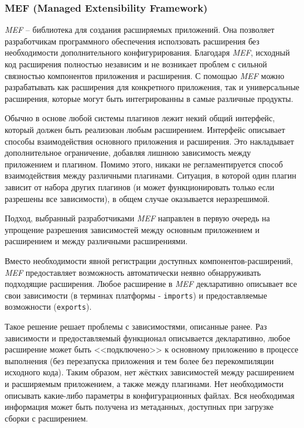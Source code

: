 \subsubsection{MEF (Managed Extensibility Framework)}

{\it MEF} -- библиотека для создания расширяемых приложений. Она позволяет разработчикам программного обеспечения исползовать расширения без необходимости дополнительного конфигурирования. Благодаря {\it MEF}, исходный код расширения полностью независим и не возникает проблем с сильной связностью компонентов приложения и расширения. С помощью {\it MEF} можно разрабатывать как расширения для конкретного приложения, так и универсальные расширения, которые могут быть интегрированны в самые различные продукты.

Обычно в основе любой системы плагинов лежит некий общий интерфейс, который должен быть реализован любым расширением. Интерфейс описывает способы взаимодействия основного приложения и расширения. Это накладывает дополнительное ограничение, добавляя лишнюю зависимость между приложением и плагином. Помимо этого, никаки не регламентируется способ взаимодействия между различными плагинами. Ситуация, в которой один плагин зависит от набора других плагинов (и может функционировать только если разрешены все зависимости), в общем случае оказывается неразрешимой.

Подход, выбранный разработчиками {\it MEF} направлен в первую очередь на упрощение разрешения зависимостей между основным приложением и расширением и между различными расширениями.

Вместо необходимости явной регистрации доступных компонентов-расширений, {\it MEF} предоставляет возможность автоматически неявно обнарруживать подходящие расширения. Любое расширение в {\it MEF} декларативно описывает все свои зависимости (в терминах платформы - {\tt imports}) и предоставляемые возможности ({\tt exports}).

Такое решение решает проблемы с зависимостями, описанные ранее. Раз зависимости и предоставляемый функционал описывается декларативно, любое расширение может быть <<подключено>> к основному приложению в процессе выполнения (без перезапуска приложения и тем более без перекомпиляции исходного кода). Таким образом, нет жёстких зависимостей между расширением и расширяемым приложением, а также между плагинами. Нет необходимости описывать какие-либо параметры в конфигурационных файлах. Вся необходимая информация может быть получена из метаданных, доступных при загрузке сборки с расширением.

